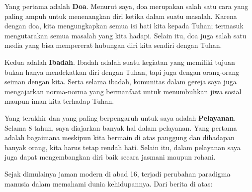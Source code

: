 \documentclass[12pt, answers]{exam}
\begin{document}
\begin{questions}
\begin{solution}
\begin{parts}
        Yang pertama adalah \textbf{Doa}. Menurut saya, doa merupakan salah satu cara
        yang paling ampuh untuk menenangkan diri ketika dalam suatu masalah.
        Karena dengan doa, kita mengungkapkan semua isi hati kita kepada Tuhan;
        termasuk mengutarakan semua masalah yang kita hadapi. Selain itu, doa
        juga salah satu media yang bisa mempererat hubungan diri kita sendiri 
        dengan Tuhan. 

        Kedua adalah \textbf{Ibadah}. Ibadah adalah suatu kegiatan yang memiliki tujuan
        bukan hanya mendekatkan diri dengan Tuhan, tapi juga dengan orang-orang
        seiman dengan kita. Serta selama ibadah, komunitas dalam gereja saya juga 
        mengajarkan norma-norma yang bermanfaat untuk menumbuhkan jiwa sosial
        maupun iman kita terhadap Tuhan.

        Yang terakhir dan yang paling berpengaruh untuk saya adalah \textbf{Pelayanan}.
        Selama 8 tahun, saya diajarkan banyak hal dalam pelayanan. Yang pertama
        adalah bagaimana meskipun kita bermain di atas panggung dan dihadapan
        banyak orang, kita harus tetap rendah hati. Selain itu, dalam pelayanan
        saya juga dapat mengembangkan diri baik secara jasmani maupun rohani.
        
        \end{parts}
        \end{solution}

        \pagebreak
        \question
        Sejak dimulainya jaman modern di abad 16, terjadi perubahan paradigma
        manusia dalam memahami dunia kehidupannya. Dari berita di atas:

        \begin{solution}
        \begin{parts}
        

\end{parts}
\end{solution}
\end{questions}
\end{document}
